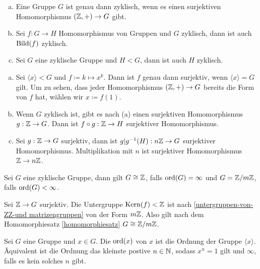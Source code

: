 \begin{lemma}
  \begin{enumerate}[(a)]
  \item Eine Gruppe \(G\) ist genau dann zyklisch,
    wenn es einen surjektiven Homomorphismus \((\mathbb{Z},+)\to G\) gibt.
  \item Sei \(f:G\to H\) Homomorphismus von Gruppen und \(G\) zyklisch, dann ist auch \(\mathrm{Bild}(f)\) zyklisch.
  \item Sei \(G\) eine zyklische Gruppe und \(H<G\), dann ist auch \(H\) zyklisch.
  \end{enumerate}
\end{lemma}

\begin{beweis}
  \begin{enumerate}[(a)]
  \item Sei \(\langle x\rangle<G\) und \(f\coloneq k\mapsto x^k\).
    Dann ist \(f\) genau dann surjektiv, wenn \(\langle x\rangle=G\) gilt.
    Um zu sehen, dass jeder Homomorphismus \((\mathbb{Z},+)\to G\) bereits die Form von \(f\) hat, wählen wir \(x\coloneq f(1)\).
  \item Wenn \(G\) zyklisch ist, gibt es nach (a) einen surjektiven Homomorphismus \(g:\mathbb{Z}\to G\). Dann ist \(f\circ g:\mathbb{Z}\to H\) surjektiver Homomorphismus.
  \item Sei \(g:\mathbb{Z}\to G\) surjektiv, dann ist \(g|g^{-1}(H):n\mathbb{Z}\to G\) surjektiver Homomorphismus. Multiplikation mit \(n\) ist surjektiver Homomorphismus \(\mathbb{Z}\to n\mathbb{Z}\).
  \end{enumerate}
\end{beweis}

\begin{satz}
  Sei \(G\) eine zyklische Gruppe, dann gilt \(G\cong \mathbb{Z}\),
  falls \(\mathrm{ord}(G)=\infty\) und \(G=\mathbb{Z}/m\mathbb{Z}\), falls \(\mathrm{ord}(G)<\infty\).
\end{satz}

\begin{beweis}
  Sei \(\mathbb{Z}\to G\) surjektiv.
  Die Untergruppe \(\mathrm{Kern}(f)<\mathbb{Z}\) ist nach
  \ref{untergruppen-von-ZZ-und matrizengruppen}
  von der Form \(m\mathbb{Z}\).
  Also gilt nach dem Homomorphiesatz \ref{homomorphiesatz} \(G\cong \mathbb{Z}/m\mathbb{Z}\).
\end{beweis}

\begin{definition}
  Sei \(G\) eine Gruppe und \(x\in G\).
  Die  \(\mathrm{ord}(x)\) von \(x\) ist die Ordnung der Gruppe \(\langle x\rangle\).
  Äquivalent ist die Ordnung das kleinste postive \(n\in \mathbb{N}\),
  sodass \(x^n=1\) gilt und \(\infty\), falls es kein solches \(n\) gibt.
\end{definition}

